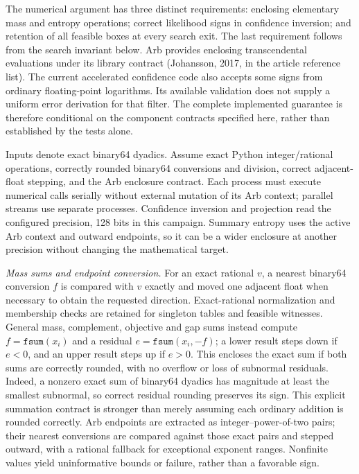 The numerical argument has three distinct requirements: enclosing elementary mass and entropy operations; correct likelihood signs in confidence inversion; and retention of all feasible boxes at every search exit. The last requirement follows from the search invariant below. Arb provides enclosing transcendental evaluations under its library contract (Johansson, 2017, in the article reference list). The current accelerated confidence code also accepts some signs from ordinary floating-point logarithms. Its available validation does not supply a uniform error derivation for that filter. The complete implemented guarantee is therefore conditional on the component contracts specified here, rather than established by the tests alone.

Inputs denote exact binary64 dyadics. Assume exact Python integer/rational operations, correctly rounded binary64 conversions and division, correct adjacent-float stepping, and the Arb enclosure contract. Each process must execute numerical calls serially without external mutation of its Arb context; parallel streams use separate processes. Confidence inversion and projection read the configured precision, 128 bits in this campaign. Summary entropy uses the active Arb context and outward endpoints, so it can be a wider enclosure at another precision without changing the mathematical target.

\emph{Mass sums and endpoint conversion.} For an exact rational $v$, a nearest binary64 conversion $f$ is compared with $v$ exactly and moved one adjacent float when necessary to obtain the requested direction. Exact-rational normalization and membership checks are retained for singleton tables and feasible witnesses. General mass, complement, objective and gap sums instead compute $f=\texttt{fsum}(x_i)$ and a residual $e=\texttt{fsum}(x_i,-f)$; a lower result steps down if $e<0$, and an upper result steps up if $e>0$. This encloses the exact sum if both sums are correctly rounded, with no overflow or loss of subnormal residuals. Indeed, a nonzero exact sum of binary64 dyadics has magnitude at least the smallest subnormal, so correct residual rounding preserves its sign. This explicit summation contract is stronger than merely assuming each ordinary addition is rounded correctly. Arb endpoints are extracted as integer--power-of-two pairs; their nearest conversions are compared against those exact pairs and stepped outward, with a rational fallback for exceptional exponent ranges. Nonfinite values yield uninformative bounds or failure, rather than a favorable sign.

